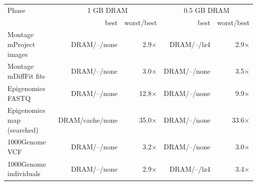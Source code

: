 \begin{tabular}{lrrrr}
\toprule
Phase & \multicolumn{2}{c}{1 GB DRAM} & \multicolumn{2}{c}{0.5 GB DRAM} \\
 & best & worst/best & best & worst/best \\
\midrule
Montage mProject images & DRAM/--/none & 2.9$\times$ & DRAM/--/lz4 & 2.9$\times$ \\
Montage mDiffFit fits & DRAM/--/none & 3.0$\times$ & DRAM/--/none & 3.5$\times$ \\
Epigenomics FASTQ & DRAM/--/none & 12.8$\times$ & DRAM/--/none & 9.9$\times$ \\
Epigenomics map (searched) & DRAM/cache/none & 35.0$\times$ & DRAM/--/none & 33.6$\times$ \\
1000Genome VCF & DRAM/--/none & 3.2$\times$ & DRAM/--/none & 3.0$\times$ \\
1000Genome individuals & DRAM/--/none & 2.9$\times$ & DRAM/--/lz4 & 3.4$\times$ \\
\bottomrule
\end{tabular}
